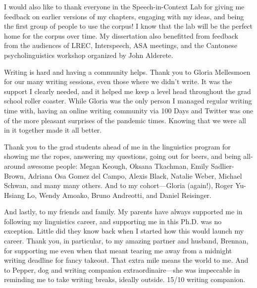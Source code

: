 I would also like to thank everyone in the Speech-in-Context Lab for giving me feedback on earlier versions of my chapters, engaging with my ideas, and being the first group of people to use the corpus! I know that the lab will be the perfect home for the corpus over time. My dissertation also benefitted from feedback from the audiences of LREC, Interspeech, ASA meetings, and the Cantonese psycholinguistics workshop organized by John Alderete.

Writing is hard and having a community helps. Thank you to Gloria Mellesmoen for our many writing sessions, even those where we didn't write. It was the support I clearly needed, and it helped me keep a level head throughout the grad school roller coaster. While Gloria was the only person I managed regular writing time with, having an online writing community via 100 Days and Twitter was one of the more pleasant surprises of the pandemic times. Knowing that we were all in it together made it all better.

Thank you to the grad students ahead of me in the linguistics program for showing me the ropes, answering my questions, going out for beers, and being all-around awesome people: Megan Keough, Oksana Tkachman, Emily Sadlier-Brown, Adriana Osa Gomez del Campo, Alexis Black, Natalie Weber, Michael Schwan, and many many others. And to my cohort---Gloria (again!), Roger Yu-Hsiang Lo, Wendy Amoako, Bruno Andreotti, and Daniel Reisinger. 

And lastly, to my friends and family. My parents have always supported me in following my linguistics career, and supporting me in this Ph.D. was no exception. Little did they know back when I started how this would launch my career. Thank you, in particular, to my amazing partner and husband, Brennan, for supporting me even when that meant tearing me away from a midnight writing deadline for fancy takeout. That extra mile means the world to me. And to Pepper, dog and writing companion extraordinaire---she was impeccable in reminding me to take writing breaks, ideally outside. 15/10 writing companion. 

\endinput %
